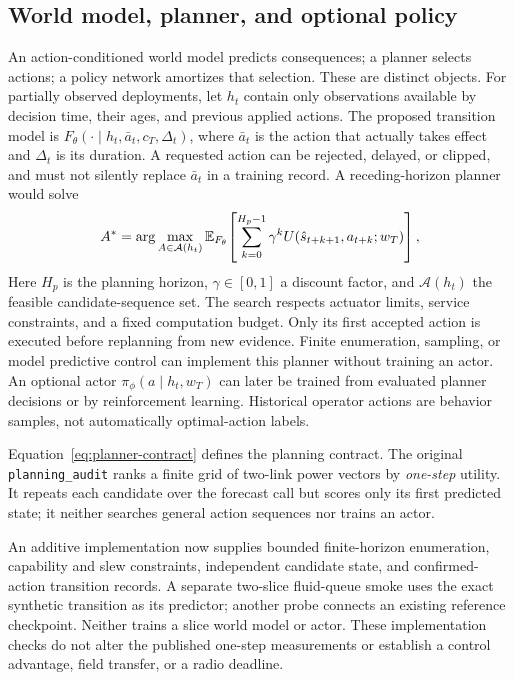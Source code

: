 \subsection{World model, planner, and optional policy}
\label{sec:planner-actions}
An action-conditioned world model predicts consequences; a planner selects
actions; a policy network amortizes that selection. These are distinct objects.
For partially observed deployments, let $h_t$ contain only observations available
by decision time, their ages, and previous applied actions. The proposed
transition model is $F_\theta(\cdot\mid h_t,\bar a_t,c_T,\Delta_t)$, where
$\bar a_t$ is the action that actually takes effect and $\Delta_t$ is its
duration. A requested action can be rejected, delayed, or clipped, and must not
silently replace $\bar a_t$ in a training record. A receding-horizon planner would
solve
\begin{equation}
 A^* = \arg\max_{A\in\mathcal A(h_t)}
 \mathbb{E}_{F_\theta}\!\left[\sum_{k=0}^{H_p-1}\gamma^k
 U(\hat s_{t+k+1},a_{t+k};w_T)\right],
 \label{eq:planner-contract}
\end{equation}
Here $H_p$ is the planning horizon, $\gamma\in[0,1]$ a discount factor, and
$\mathcal A(h_t)$ the feasible candidate-sequence set. The search respects
actuator limits, service constraints, and a fixed computation budget.
Only its first accepted action is executed before replanning from new evidence.
Finite enumeration, sampling, or model predictive control can implement this
planner without training an actor. An optional actor
$\pi_\phi(a\mid h_t,w_T)$ can later be trained from evaluated planner decisions
or by reinforcement learning. Historical operator actions are behavior samples,
not automatically optimal-action labels.

Equation~\eqref{eq:planner-contract} defines the planning contract. The original
\texttt{planning\_audit} ranks a finite grid
of two-link power vectors by \emph{one-step} utility. It repeats each candidate
over the forecast call but scores only its first predicted state; it neither
searches general action sequences nor trains an actor.

An additive implementation now supplies bounded finite-horizon enumeration,
capability and slew constraints, independent candidate state, and confirmed-action
transition records. A separate two-slice fluid-queue smoke uses the exact
synthetic transition as its predictor; another probe connects an existing
reference checkpoint. Neither trains a slice world model or actor. These
implementation checks do not alter the published one-step measurements or
establish a control advantage, field transfer, or a radio deadline.

